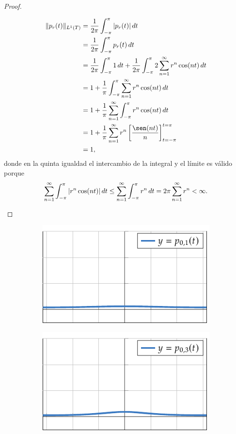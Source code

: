 \documentclass[a4paper, 11pt, oneside]{report}
\begin{document}
\begin{proof}
\begin{enumerate}
    \begin{align*}
      \|p_r(t)\|_{L^1(T)} &= \frac{1}{2\pi}\int_{-\pi}^\pi |p_r(t)| \, dt \\
      &= \frac{1}{2\pi}\int_{-\pi}^\pi p_r(t) \, dt \\ 
      &= \frac{1}{2\pi}\int_{-\pi}^\pi 1 \, dt + \frac{1}{2\pi}\int_{-\pi}^\pi 2\sum_{n=1}^\infty r^n \cos(nt) \, dt \\
      &= 1+\frac{1}{\pi}\int_{-\pi}^\pi \sum_{n=1}^\infty r^n \cos(nt)\, dt \\
      &= 1+\frac{1}{\pi}\sum_{n=1}^\infty \int_{-\pi}^\pi r^n \cos(nt) \, dt \\
      &= 1+\frac{1}{\pi}\sum_{n=1}^\infty r^n \left[\frac{\sen(nt)}{n}\right]_{t=-\pi}^{t=\pi} \\
      &= 1,
    \end{align*}
    donde en la quinta igualdad el intercambio de la integral y el límite es válido porque
    \[\sum_{n=1}^\infty \int_{-\pi}^\pi |r^n \cos(nt)| \, dt \leq \sum_{n=1}^\infty \int_{-\pi}^\pi r^n \, dt = 2\pi \sum_{n=1}^\infty r^n < \infty. \qedhere\]
  \end{enumerate}
\end{proof}


\begin{figure}[H]
  \centering
  \begin{subfigure}[b]{0.49\textwidth}
    \centering
    \includegraphics{./plot23/main.pdf}
  \end{subfigure}
  \begin{subfigure}[b]{0.49\textwidth}
    \centering
    \includegraphics{./plot24/main.pdf}
  \end{subfigure}
\end{figure}
\end{document}
